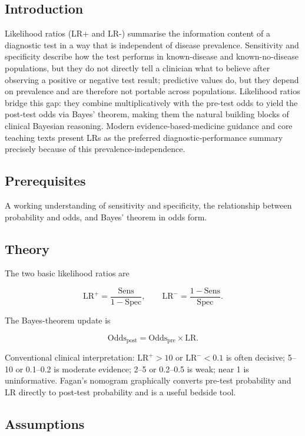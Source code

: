\documentclass[
]{article}
\author{}
\date{\vspace{-2.5em}}
\begin{document}
\subsection{Introduction}\label{introduction}

Likelihood ratios (LR+ and LR-) summarise the information content of a
diagnostic test in a way that is independent of disease prevalence.
Sensitivity and specificity describe how the test performs in
known-disease and known-no-disease populations, but they do not directly
tell a clinician what to believe after observing a positive or negative
test result; predictive values do, but they depend on prevalence and are
therefore not portable across populations. Likelihood ratios bridge this
gap: they combine multiplicatively with the pre-test odds to yield the
post-test odds via Bayes' theorem, making them the natural building
blocks of clinical Bayesian reasoning. Modern evidence-based-medicine
guidance and core teaching texts present LRs as the preferred
diagnostic-performance summary precisely because of this
prevalence-independence.

\subsection{Prerequisites}\label{prerequisites}

A working understanding of sensitivity and specificity, the relationship
between probability and odds, and Bayes' theorem in odds form.

\subsection{Theory}\label{theory}

The two basic likelihood ratios are

\[\mathrm{LR}^+ = \frac{\mathrm{Sens}}{1 - \mathrm{Spec}}, \qquad \mathrm{LR}^- = \frac{1 - \mathrm{Sens}}{\mathrm{Spec}}.\]

The Bayes-theorem update is

\[\mathrm{Odds}_{\text{post}} = \mathrm{Odds}_{\text{pre}} \times \mathrm{LR}.\]

Conventional clinical interpretation: \(\mathrm{LR}^+ > 10\) or
\(\mathrm{LR}^- < 0.1\) is often decisive; 5--10 or 0.1--0.2 is moderate
evidence; 2--5 or 0.2--0.5 is weak; near 1 is uninformative. Fagan's
nomogram graphically converts pre-test probability and LR directly to
post-test probability and is a useful bedside tool.

\subsection{Assumptions}\label{assumptions}
\end{document}
